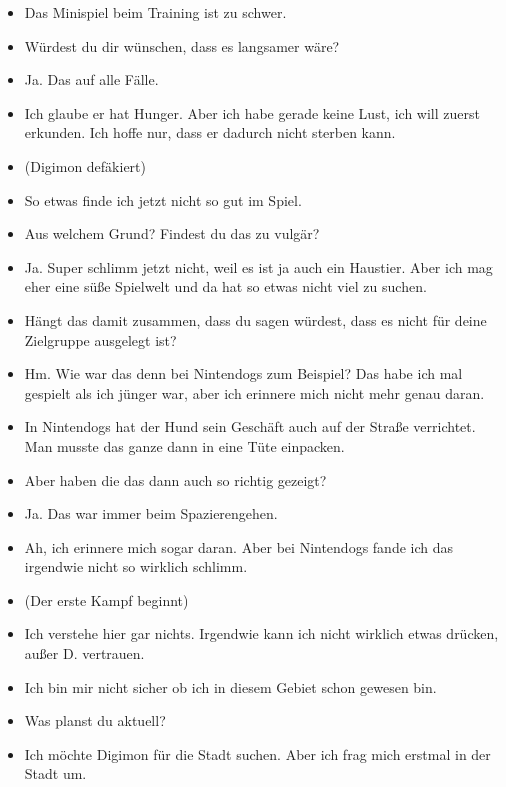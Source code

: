 {\begin{itemize}[]
    \item {} Das Minispiel beim Training ist zu schwer.
    \item {} Würdest du dir wünschen, dass es langsamer wäre?
    \item {} Ja. Das auf alle Fälle.
    \item {} Ich glaube er hat Hunger. Aber ich habe gerade keine Lust, ich will zuerst erkunden. Ich hoffe nur, dass er dadurch nicht sterben kann.
    \item {} (Digimon defäkiert)
    \item {} So etwas finde ich jetzt nicht so gut im Spiel.
    \item {} Aus welchem Grund? Findest du das zu vulgär?
    \item {} Ja. Super schlimm jetzt nicht, weil es ist ja auch ein Haustier. Aber ich mag eher eine süße Spielwelt und da hat so etwas nicht viel zu suchen.
    \item {} Hängt das damit zusammen, dass du sagen würdest, dass es nicht für deine Zielgruppe ausgelegt ist? 
    \item {} Hm. Wie war das denn bei Nintendogs zum Beispiel? Das habe ich mal gespielt als ich jünger war, aber ich erinnere mich nicht mehr genau daran.
    \item {} In Nintendogs hat der Hund sein Geschäft auch auf der Straße verrichtet. Man musste das ganze dann in eine Tüte einpacken.
    \item {} Aber haben die das dann auch so richtig gezeigt?
    \item {} Ja. Das war immer beim Spazierengehen.
    \item {} Ah, ich erinnere mich sogar daran. Aber bei Nintendogs fande ich das irgendwie nicht so wirklich schlimm.
    \item {} (Der erste Kampf beginnt)
    \item {} Ich verstehe hier gar nichts. Irgendwie kann ich nicht wirklich etwas drücken, außer \frq  D. vertrauen\flq{}.
    \item {} Ich bin mir nicht sicher ob ich in diesem Gebiet schon gewesen bin.
    \item {} Was planst du aktuell?
    \item {} Ich möchte Digimon für die Stadt suchen. Aber ich frag mich erstmal in der Stadt um.

\end{itemize}}
